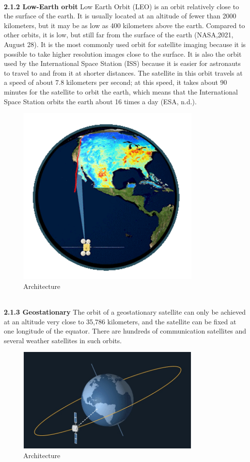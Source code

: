 \documentclass[conference]{IEEEtran}
\begin{document}
\\
{\bf 2.1.2	Low-Earth orbit\rm}
Low Earth Orbit (LEO) is an orbit relatively close to the surface of the earth. It is usually located at an altitude of fewer than 2000 kilometers, but it may be as low as 400 kilometers above the earth. Compared to other orbits, it is low, but still far from the surface of the earth (NASA,2021, August 28).
It is the most commonly used orbit for satellite imaging because it is possible to take higher resolution images close to the surface. It is also the orbit used by the International Space Station (ISS) because it is easier for astronauts to travel to and from it at shorter distances. The satellite in this orbit travels at a speed of about 7.8 kilometers per second; at this speed, it takes about 90 minutes for the satellite to orbit the earth, which means that the International Space Station orbits the earth about 16 times a day (ESA, n.d.).
\begin{figure}[htbp]
	\centerline{\includegraphics[width=260pt]{images/1.1.2.png}}
	\caption{Architecture}
	\label{fig3}
\end{figure}

\\
{\bf 2.1.3	Geostationary\rm}
The orbit of a geostationary satellite can only be achieved at an altitude very close to 35,786 kilometers, and the satellite can be fixed at one longitude of the equator. There are hundreds of communication satellites and several weather satellites in such orbits.

\begin{figure}[htbp]
	\centerline{\includegraphics[width=260pt]{images/1.1.3.png}}
	\caption{Architecture}
	\label{fig3}
\end{figure}
\\
\end{document}
